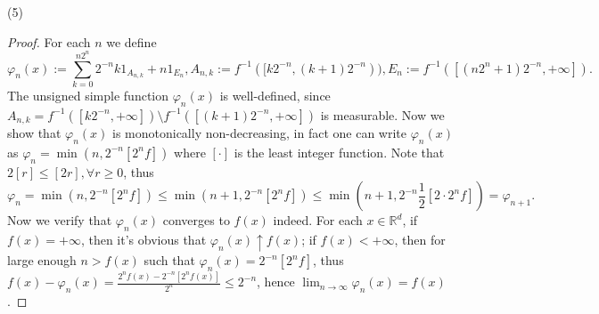 \documentclass[a4paper]{article}
\begin{document}
(5)\begin{proof}
For each $n$ we define $$
\varphi_n(x) := \sum_{k = 0}^{n2^n} 2^{-n}k1_{A_{n, k}} + n1_{E_n},A_{n, k} := f^{-1}([k2^{-n}, (k + 1)2^{-n})),
E_n := f^{-1}([(n2^n + 1)2^{-n}, +\infty]).
$$The unsigned simple function $\varphi_n(x)$ is well-defined, since $A_{n, k} = f^{-1}([k2^{-n}, +\infty]) \setminus
f^{-1}([(k + 1)2^{-n}, +\infty])$ is measurable. Now we show that $\varphi_n(x)$ is monotonically non-decreasing, 
in fact one can write $\varphi_n(x)$ as $\varphi_n = \min(n, 2^{-n}[2^nf])$ where $[\cdot]$ is the least integer
function. Note that $2[r] \leq [2r], \forall r \geq 0$, thus $$
\varphi_n = \min(n, 2^{-n}[2^nf]) \leq \min(n + 1, 2^{-n}[2^nf]) \leq \min(n + 1, 2^{-n}\frac{1}{2}[2\cdot 2^nf])
= \varphi_{n + 1}.
$$Now we verify that $\varphi_n(x)$ converges to $f(x)$ indeed. For each $x \in \mathbb{R}^d$, if $f(x) = +\infty$,
then it's obvious that $\varphi_n(x) \uparrow f(x)$; if $f(x) < +\infty$, then for large enough $n > f(x)$ such that 
$\varphi_n(x) = 2^{-n}[2^nf]$, thus $f(x) - \varphi_n(x) = \frac{2^nf(x) - 2^{-n}[2^nf(x)]}{2^n} \leq 2^{-n}$,
hence $\lim_{n \to \infty} \varphi_n(x) = f(x)$.
\end{proof}
\end{document}
